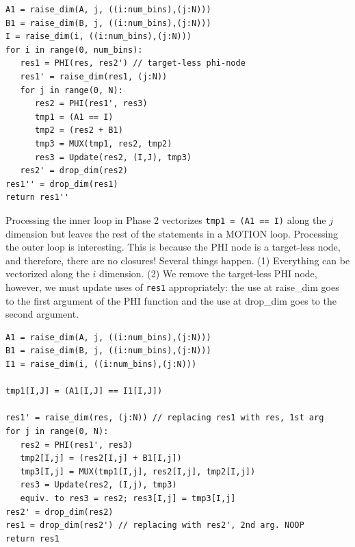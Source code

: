 \documentclass[sigconf, screen, natbib=false, dvipsnames, table]{acmart}
\theoremstyle{definition}
\begin{document}
{\small
\begin{verbatim}
A1 = raise_dim(A, j, ((i:num_bins),(j:N)))
B1 = raise_dim(B, j, ((i:num_bins),(j:N)))
I = raise_dim(i, ((i:num_bins),(j:N)))
for i in range(0, num_bins):
   res1 = PHI(res, res2') // target-less phi-node
   res1' = raise_dim(res1, (j:N))
   for j in range(0, N):
      res2 = PHI(res1', res3)
      tmp1 = (A1 == I)
      tmp2 = (res2 + B1)
      tmp3 = MUX(tmp1, res2, tmp2)
      res3 = Update(res2, (I,J), tmp3) 
   res2' = drop_dim(res2)    
res1'' = drop_dim(res1)
return res1''
\end{verbatim}
}

Processing the inner loop in Phase 2 vectorizes \texttt{tmp1 = (A1 == I)} along the $j$ dimension but leaves the rest of the statements in a MOTION loop. Processing the outer loop is interesting. This is because the PHI node is a target-less node, and therefore, there are no closures! Several things happen. (1) Everything can be vectorized along the $i$ dimension. (2) We remove the target-less PHI node, however, we must update uses of \texttt{res1} appropriately: the use at raise\_dim goes to the first argument of the PHI function and the use at drop\_dim goes to the second argument.

{\small
\begin{verbatim}
A1 = raise_dim(A, j, ((i:num_bins),(j:N)))
B1 = raise_dim(B, j, ((i:num_bins),(j:N)))
I1 = raise_dim(i, ((i:num_bins),(j:N)))

tmp1[I,J] = (A1[I,J] == I1[I,J])

res1' = raise_dim(res, (j:N)) // replacing res1 with res, 1st arg
for j in range(0, N):
   res2 = PHI(res1', res3)
   tmp2[I,j] = (res2[I,j] + B1[I,j])
   tmp3[I,j] = MUX(tmp1[I,j], res2[I,j], tmp2[I,j])
   res3 = Update(res2, (I,j), tmp3)
   equiv. to res3 = res2; res3[I,j] = tmp3[I,j]
res2' = drop_dim(res2)   
res1 = drop_dim(res2') // replacing with res2', 2nd arg. NOOP
return res1
\end{verbatim}
}

\end{document}

